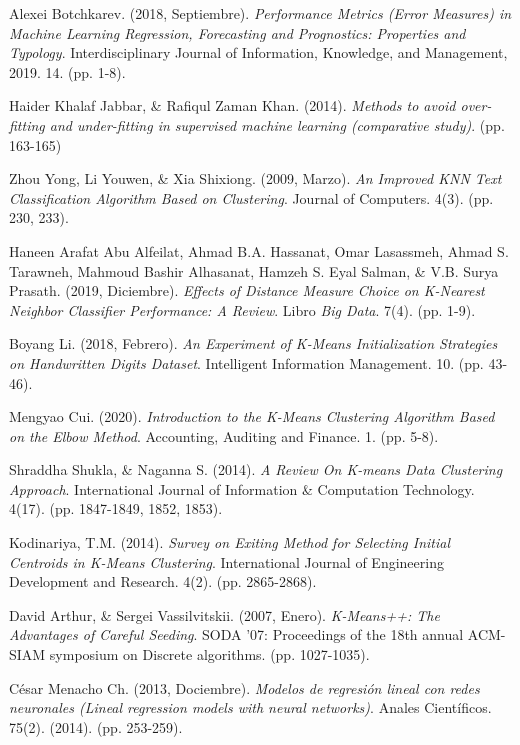 \documentclass[12pt,a4paper]{article}
\begin{document}
\begin{sloppypar}
\begin{thebibliography}{9}
Alexei Botchkarev. (2018, Septiembre). \textit{Performance Metrics (Error Measures) in Machine Learning Regression, Forecasting and Prognostics: Properties and Typology}. Interdisciplinary Journal of Information, Knowledge, and Management, 2019. 14. (pp. 1-8).

Haider Khalaf Jabbar, \& Rafiqul Zaman Khan. (2014). \textit{Methods to avoid over-fitting and under-fitting in supervised machine learning (comparative study)}. (pp. 163-165)

Zhou Yong,  Li Youwen, \& Xia Shixiong. (2009, Marzo). \textit{An Improved KNN Text Classification Algorithm Based on Clustering}. Journal of Computers. 4(3). (pp. 230, 233). 

Haneen Arafat Abu Alfeilat, Ahmad B.A. Hassanat, Omar Lasassmeh, Ahmad S. Tarawneh, Mahmoud Bashir Alhasanat, Hamzeh S. Eyal Salman, \& V.B. Surya Prasath. (2019, Diciembre). \textit{Effects of Distance Measure Choice on K-Nearest Neighbor Classifier Performance: A Review}. Libro \textit{Big Data}. 7(4). (pp. 1-9).

Boyang Li. (2018, Febrero). \textit{An Experiment of K-Means Initialization Strategies on Handwritten Digits Dataset}. Intelligent Information Management. 10. (pp. 43-46). 

Mengyao Cui. (2020). \textit{Introduction to the K-Means Clustering Algorithm Based on the Elbow Method}. Accounting, Auditing and Finance. 1. (pp. 5-8).

Shraddha Shukla, \& Naganna S. (2014). \textit{A Review On K-means Data Clustering Approach}. International Journal of Information \& Computation Technology. 4(17). (pp. 1847-1849, 1852, 1853).

Kodinariya, T.M. (2014). \textit{Survey on Exiting Method for Selecting Initial Centroids in K-Means Clustering}. International Journal of Engineering Development and Research. 4(2). (pp. 2865-2868).

David Arthur, \& Sergei Vassilvitskii. (2007, Enero). \textit{K-Means++: The Advantages of Careful Seeding}. SODA '07: Proceedings of the 18th annual ACM-SIAM symposium on Discrete algorithms. (pp. 1027-1035).

César Menacho Ch. (2013, Dociembre). \textit{Modelos de regresión lineal con redes neuronales (Lineal regression models with neural networks)}. Anales Científicos. 75(2). (2014). (pp. 253-259).


\end{thebibliography}
\end{sloppypar}
\end{document}
